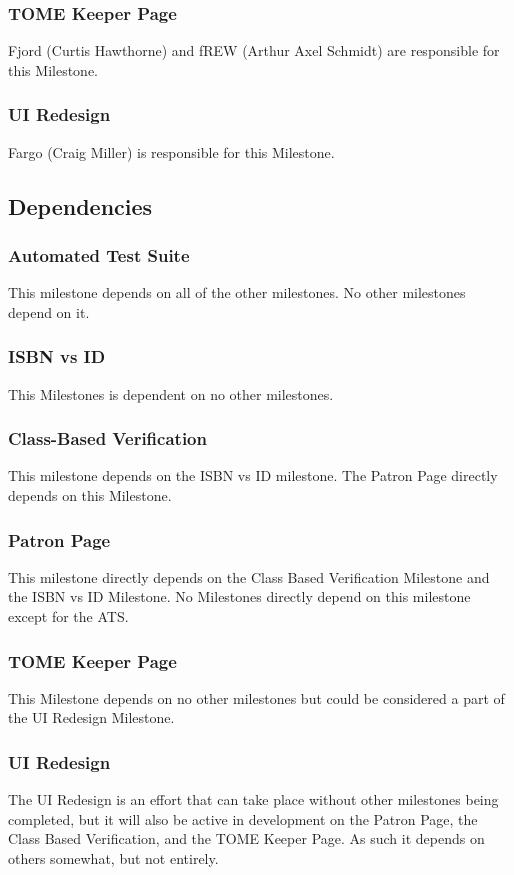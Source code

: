\documentclass[12pt,titlepage]{article}
\begin{document}
\subsubsection{TOME Keeper Page}
Fjord (Curtis Hawthorne) and fREW (Arthur Axel Schmidt) are responsible for this Milestone.
\subsubsection{UI Redesign}
Fargo (Craig Miller) is responsible for this Milestone.
\subsection{Dependencies}
\subsubsection{Automated Test Suite}
This milestone depends on all of the other milestones.  No other milestones depend on it.
\subsubsection{ISBN vs ID}
This Milestones is dependent on no other milestones.
\subsubsection{Class-Based Verification}
This milestone depends on the ISBN vs ID milestone.  The Patron Page directly depends on this Milestone.
\subsubsection{Patron Page}
This milestone directly depends on the Class Based Verification Milestone and the ISBN vs ID Milestone.  No Milestones directly depend on this milestone except for the ATS.
\subsubsection{TOME Keeper Page}
This Milestone depends on no other milestones but could be considered a part of the UI Redesign Milestone.
\subsubsection{UI Redesign}
The UI Redesign is an effort that can take place without other milestones being completed, but it will also be active in development on the Patron Page, the Class Based Verification, and the TOME Keeper Page.  As such it depends on others somewhat, but not entirely.
\end{document}

